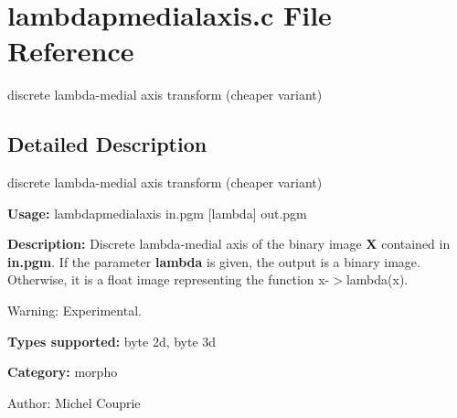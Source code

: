 \section{lambdapmedialaxis.c File Reference}
\label{lambdapmedialaxis_8c}
discrete lambda-medial axis transform (cheaper variant) 



\subsection{Detailed Description}
discrete lambda-medial axis transform (cheaper variant) 

{\bf Usage:} lambdapmedialaxis in.pgm [lambda] out.pgm

{\bf Description:} Discrete lambda-medial axis of the binary image {\bf X} contained in {\bf in.pgm}. If the parameter {\bf lambda} is given, the output is a binary image. Otherwise, it is a float image representing the function x-$>$lambda(x).

\begin{Desc}
\item[Warning:]Experimental.\end{Desc}
{\bf Types supported:} byte 2d, byte 3d

{\bf Category:} morpho

\begin{Desc}
\item[Author:]Michel Couprie \end{Desc}

